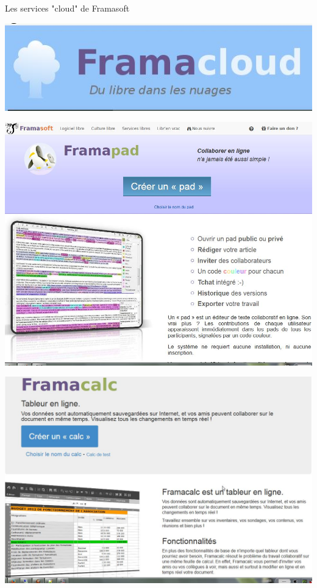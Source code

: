 \documentclass{beamer}
\begin{document}
\begin{frame}
\Huge{\centerline{Les services "cloud" de Framasoft}}
\begin{center}
\includegraphics[scale=0.6]{./images/Framacloud.jpg}
\end{center}
\end{frame}

\begin{frame}
\begin{center}
\includegraphics[scale=0.5]{./images/Framapad.jpg}
\end{center}
\end{frame}

\begin{frame}
\begin{center}
\includegraphics[scale=0.5]{./images/FramaCalc.jpg}
\end{center}
\end{frame}
\end{document}
